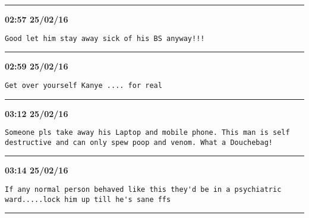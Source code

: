 \hrule%

\begin{adjustwidth}{0cm}{0cm}
\footnotesize \textbf{02:57 25/02/16}

\begin{lstlisting}[breaklines, breakatwhitespace, basicstyle=\small, frame=leftline]
Good let him stay away sick of his BS anyway!!!
\end{lstlisting}
\end{adjustwidth}

\hrule%

\begin{adjustwidth}{0cm}{0cm}
\footnotesize \textbf{02:59 25/02/16}

\begin{lstlisting}[breaklines, breakatwhitespace, basicstyle=\small, frame=leftline]
Get over yourself Kanye .... for real
\end{lstlisting}
\end{adjustwidth}

\hrule%

\begin{adjustwidth}{0cm}{0cm}
\footnotesize \textbf{03:12 25/02/16}

\begin{lstlisting}[breaklines, breakatwhitespace, basicstyle=\small, frame=leftline]
Someone pls take away his Laptop and mobile phone. This man is self destructive and can only spew poop and venom. What a Douchebag!
\end{lstlisting}
\end{adjustwidth}

\hrule%

\begin{adjustwidth}{0cm}{0cm}
\footnotesize \textbf{03:14 25/02/16}

\begin{lstlisting}[breaklines, breakatwhitespace, basicstyle=\small, frame=leftline]
If any normal person behaved like this they'd be in a psychiatric ward.....lock him up till he's sane ffs
\end{lstlisting}
\end{adjustwidth}

\hrule%

